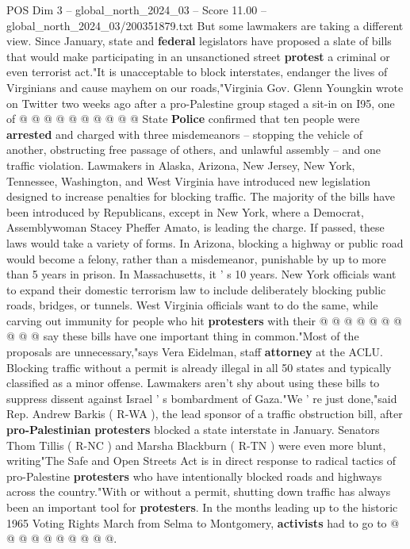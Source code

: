 \begin{textsample}{POS Dim 3 – global\_north\_2024\_03 – Score 11.00 – global\_north\_2024\_03/200351879.txt}
But some lawmakers are taking a different view.
Since January, state and \textbf{federal} legislators have proposed a slate of bills that would make participating in an unsanctioned street \textbf{protest} a criminal or even terrorist act."It is unacceptable to block interstates, endanger the lives of Virginians and cause mayhem on our roads,"Virginia Gov.
Glenn Youngkin wrote on Twitter two weeks ago after a pro-Palestine group staged a sit-in on I95, one of @ @ @ @ @ @ @ @ @ @ State \textbf{Police} confirmed that ten people were \textbf{arrested} and charged with three misdemeanors -- stopping the vehicle of another, obstructing free passage of others, and unlawful assembly -- and one traffic violation.
Lawmakers in Alaska, Arizona, New Jersey, New York, Tennessee, Washington, and West Virginia have introduced new legislation designed to increase penalties for blocking traffic.
The majority of the bills have been introduced by Republicans, except in New York, where a Democrat, Assemblywoman Stacey Pheffer Amato, is leading the charge.
If passed, these laws would take a variety of forms.
In Arizona, blocking a highway or public road would become a felony, rather than a misdemeanor, punishable by up to more than 5 years in prison.
In Massachusetts, it ' s 10 years.
New York officials want to expand their domestic terrorism law to include deliberately blocking public roads, bridges, or tunnels.
West Virginia officials want to do the same, while carving out immunity for people who hit \textbf{protesters} with their @ @ @ @ @ @ @ @ @ @ say these bills have one important thing in common."Most of the proposals are unnecessary,"says Vera Eidelman, staff \textbf{attorney} at the ACLU.
Blocking traffic without a permit is already illegal in all 50 states and typically classified as a minor offense.
Lawmakers aren't shy about using these bills to suppress dissent against Israel ' s bombardment of Gaza."We ' re just done,"said Rep.
Andrew Barkis ( R-WA ), the lead sponsor of a traffic obstruction bill, after \textbf{pro-Palestinian} \textbf{protesters} blocked a state interstate in January.
Senators Thom Tillis ( R-NC ) and Marsha Blackburn ( R-TN ) were even more blunt, writing"The Safe and Open Streets Act is in direct response to radical tactics of pro-Palestine \textbf{protesters} who have intentionally blocked roads and highways across the country."With or without a permit, shutting down traffic has always been an important tool for \textbf{protesters}.
In the months leading up to the historic 1965 Voting Rights March from Selma to Montgomery, \textbf{activists} had to go to @ @ @ @ @ @ @ @ @ @.

\end{textsample}
